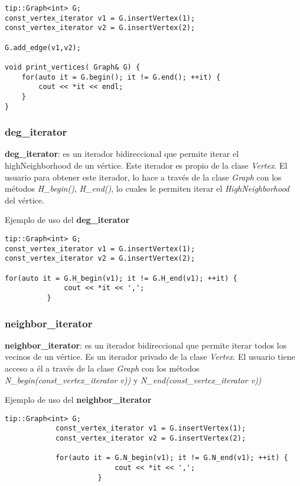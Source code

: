 \documentclass[a4paper,12pt]{article}
\begin{document}
\begin{lstlisting}[frame=single]
tip::Graph<int> G;
const_vertex_iterator v1 = G.insertVertex(1);
const_vertex_iterator v2 = G.insertVertex(2);

G.add_edge(v1,v2);

void print_vertices( Graph& G) {
    for(auto it = G.begin(); it != G.end(); ++it) {
        cout << *it << endl;
    }
}
\end{lstlisting}

\subsubsection{deg\_iterator}
\label{sec:deg_iterator}

\textbf{deg\_iterator}: es un iterador bidireccional que permite iterar el highNeighborhood de un vértice. Este iterador es propio de la clase \textit{Vertex}. El usuario para obtener este iterador, lo hace a través de la clase \textit{Graph} con los métodos 
\textit{H\_begin()}, \textit{H\_end()}, lo cuales le permiten iterar el \textit{HighNeighborhood} del vértice.

Ejemplo de uso del \textbf{deg\_iterator}

\begin{lstlisting}[frame=single]
tip::Graph<int> G;
const_vertex_iterator v1 = G.insertVertex(1);
const_vertex_iterator v2 = G.insertVertex(2);

for(auto it = G.H_begin(v1); it != G.H_end(v1); ++it) {
              cout << *it << ',';
          }
\end{lstlisting}

\subsubsection{neighbor\_iterator}
\label{sec:neighbor iterator}
\textbf{neighbor\_iterator}: es un iterador bidireccional que permite iterar todos los vecinos de un vértice. Es un iterador privado de la clase \textit{Vertex}. El usuario tiene acceso a él a través de la clase \textit{Graph} con los métodos \textit{N\_begin(const\_vertex\_iterator v))} y \textit{N\_end(const\_vertex\_iterator v))}

                        Ejemplo de uso del \textbf{neighbor\_iterator}
\textit{}
            \begin{lstlisting}[frame=single]
            tip::Graph<int> G;
            const_vertex_iterator v1 = G.insertVertex(1);
            const_vertex_iterator v2 = G.insertVertex(2);

            for(auto it = G.N_begin(v1); it != G.N_end(v1); ++it) {
                          cout << *it << ',';
                      }
            \end{lstlisting}
\end{document}
